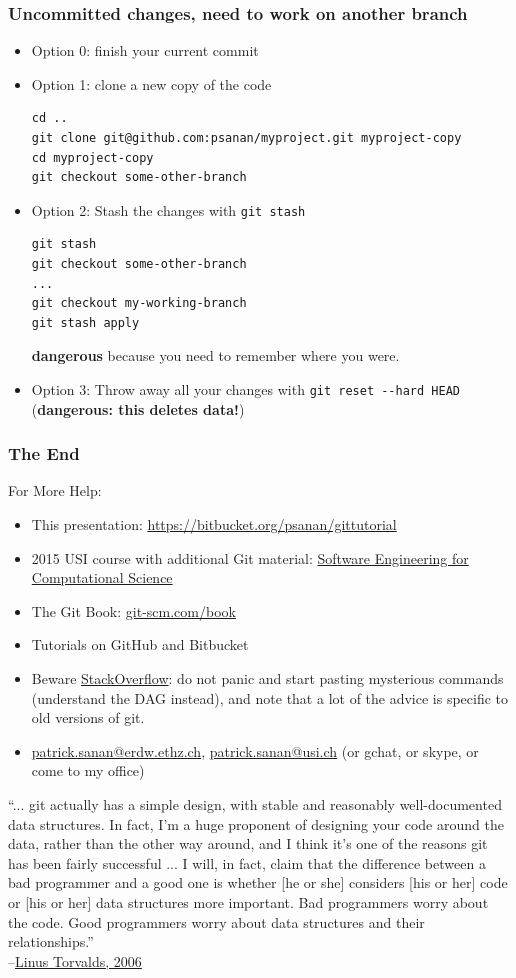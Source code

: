 \documentclass{beamer}
\begin{document}
\begin{frame}[fragile]
\frametitle{Uncommitted changes, need to work on another branch}
\begin{itemize}
\item Option 0: finish your current commit
\item Option 1: clone a new copy of the code
\begin{lstlisting}
cd .. 
git clone git@github.com:psanan/myproject.git myproject-copy
cd myproject-copy
git checkout some-other-branch
\end{lstlisting}
\item Option 2: Stash the changes with \lstinline{git stash}
\begin{lstlisting}
git stash
git checkout some-other-branch
...
git checkout my-working-branch
git stash apply
\end{lstlisting}
\textbf{dangerous} because you need to remember where you were.
\item Option 3: Throw away all your changes with \lstinline{git reset --hard HEAD} (\textbf{dangerous: this deletes data!})
\end{itemize}
\end{frame}

\begin{frame}[fragile]
\frametitle{The End}

For More Help:
\begin{itemize}
\item This presentation: \href{https://bitbucket.org/psanan/gittutorial}{https://bitbucket.org/psanan/gittutorial}
\item 2015 USI course with additional Git material: \href{https://bitbucket.org/psanan/SEFCS2015}{Software Engineering for Computational Science}
\item
The Git Book: \href{https://git-scm.com/book}{git-scm.com/book}
\item 
Tutorials on GitHub and Bitbucket
\item 
  Beware \href{https://www.stackoverflow.com}{StackOverflow}: do not panic and start pasting mysterious commands (understand the DAG instead), and note that a lot of the advice is specific to old versions of git.
\item \href{mailto:patrick.sanan@erdw.ethz.ch}{patrick.sanan@erdw.ethz.ch}, \href{mailto:patrick.sanan@usi.ch}{patrick.sanan@usi.ch} (or gchat, or skype, or come to my office)
\end{itemize}
\vspace{30px}
{\tiny ``... git actually has a simple design, with stable and reasonably well-documented data structures. 
In fact, I'm a huge proponent of designing your code around the data, rather than the other 
way around, and I think it's one of the reasons git has been fairly successful ... I will, in 
fact, claim that the difference between a bad programmer and a good one is whether [he or she] 
considers [his or her] code or [his or her] data structures more important. Bad programmers worry 
about the code. Good programmers worry about data structures and their relationships.''\\
--\href{http://lwn.net/Articles/193245/}{Linus Torvalds, 2006}
}
\end{frame}
\end{document}
